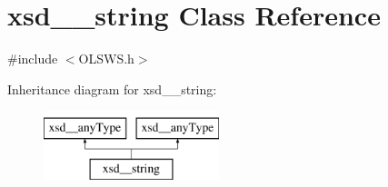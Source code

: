 \hypertarget{classxsd____string}{
\section{xsd\_\-\_\-string Class Reference}
\label{classxsd____string}
}


{\ttfamily \#include $<$OLSWS.h$>$}

Inheritance diagram for xsd\_\-\_\-string:\begin{figure}[H]
\begin{center}
\leavevmode
\includegraphics[height=2.000000cm]{classxsd____string}
\end{center}
\end{figure}
